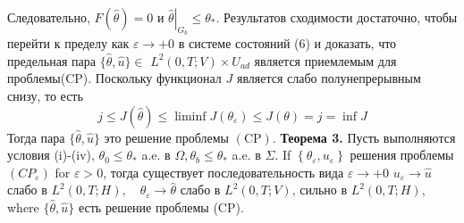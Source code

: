 Следовательно, $F(\widehat{\theta})=0$ и $\left.\widehat{\theta}\right|_{G_{b}} \leq \theta_{*}$.
Результатов сходимости достаточно, чтобы перейти к пределу как $\varepsilon \rightarrow+0$
в системе состояний (6) и доказать, что предельная пара
$\{\widehat{\theta}, \widehat{u}\} \in$ $L^{2}(0, T ; V) \times U_{a d}$
является приемлемым для проблемы(CP).
Поскольку функционал $J$ является слабо полунепрерывным снизу, то есть
\[
    j \leq J(\widehat{\theta}) \leq \liminf J\left(\theta_{\varepsilon}\right) \leq J(\theta)=j=\inf J
\]
Тогда пара $\{\widehat{\theta}, \widehat{u}\}$ это решение проблемы $(\mathrm{CP})$.
\textbf{Теорема 3.} Пусть выполняются условия (i)-(iv),
$\theta_{0} \leq \theta_{*}$ a.e. в $\Omega, \theta_{b} \leq \theta_{*}$ a.e.
в
$\Sigma$.
If $\left\{\theta_{\varepsilon}, u_{\varepsilon}\right\}$  решения проблемы
$\left(C P_{\varepsilon}\right)$ for $\varepsilon>0$, тогда существует последовательность вида
$\varepsilon \rightarrow+0$ $u_{\varepsilon} \rightarrow \widehat{u}$ слабо в
$L^{2}(0, T ; H), \quad \theta_{\varepsilon} \rightarrow \widehat{\theta}$
слабо в $L^{2}(0, T ; V)$,
сильно в $L^{2}(0, T ; H)$, where $\{\widehat{\theta}, \widehat{u}\}$ есть решение проблемы (CP).

